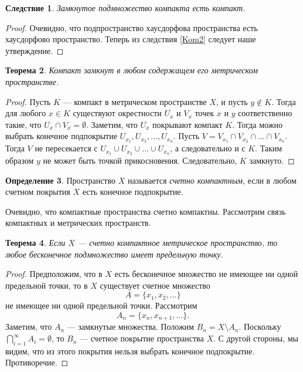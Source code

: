 \documentclass[12pt, titlepage, oneside]{amsbook}
\newtheorem{theorem}{Теорема}[chapter]
\newtheorem{corollary}[theorem]{Следствие}
\theoremstyle{definition}
\newtheorem{definition}[theorem]{Определение}
\theoremstyle{remark}
\begin{document}
 \begin{corollary}
\label{Kom3}
Замкнутое подмножество компакта есть компакт.
\end{corollary}

\begin{proof}
Очевидно, что подпространство хаусдорфова пространства есть хаусдорфово пространство. Теперь из следствия \ref{Kom2} следует наше утверждение.
\end{proof}

 \begin{theorem}
\label{Kom4}
Компакт замкнут в любом содержащем его метрическом пространстве.
\end{theorem}

\begin{proof}
Пусть $K$ --- компакт в метрическом пространстве $X$, и пусть $y\not\in K$. Тогда для любого $x\in K$ существуют окрестности $U_x$ и $V_x$ точек $x$ и $y$ соответственно такие, что $U_x\cap V_x=\emptyset$. Заметим, что $U_x$ покрывают компакт $K$. Тогда можно выбрать конечное подпокрытие $U_{x_1},U_{x_2},\ldots, U_{x_n}$. Пусть $V=V_{x_1}\cap V_{x_2}\cap\ldots\cap V_{x_n}$. Тогда $V$ не пересекается с $U_{x_1}\cup U_{x_2}\cup\ldots\cup U_{x_n}$, а следовательно и с $K$. Таким образом $y$ не может быть точкой прикосновения. Следовательно, $K$ замкнуто.
\end{proof}

\begin{definition}
Пространство $X$ называется \emph{счетно компактным}, если в любом счетном покрытия $X$ есть конечное подпокрытие.
\end{definition}

Очевидно, что компактные пространства счетно компактны. Рассмотрим связь компактных и метрических пространств.

 \begin{theorem}
\label{Kom5}
Если $X$ --- счетно компактное метрическое пространство, то любое бесконечное подмножество имеет предельную точку.
\end{theorem}

\begin{proof}
Предположим, что в $X$ есть бесконечное множество не имеющее ни одной предельной точки, то в $X$ существует счетное множество $$A=\{x_1,x_2,\ldots\}$$ не имеющее ни одной предельной точки. Рассмотрим $$A_n=\{x_{n},x_{n+1},\ldots\}.$$ Заметим, что $A_n$ --- замкнутые множества. Положим $B_n=X\setminus A_n$. Поскольку $\bigcap\limits_{i=1}^{\infty} A_i=\emptyset$, то $B_n$ --- счетное покрытие пространства $X$. С другой стороны, мы видим, что из этого покрытия нельзя выбрать конечное подпокрытие. Противоречие.
\end{proof}
\end{document}
